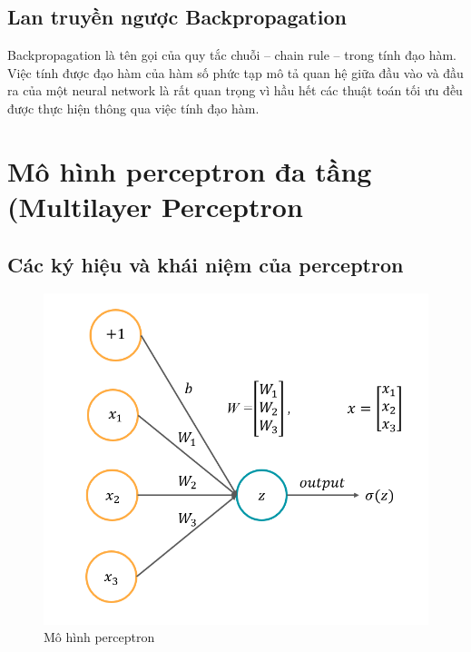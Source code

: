 \documentclass{report}
\begin{document}
            \fontsize{15}{10}\selectfont
            \subsection{Lan truyền ngược Backpropagation}
                \fontsize{13}{10}\selectfont
                    Backpropagation là tên gọi của quy tắc chuỗi – chain rule – trong tính đạo hàm. Việc tính được đạo hàm của hàm số phức tạp mô tả quan hệ giữa đầu vào và đầu ra của một neural network là rất quan trọng vì hầu hết các thuật toán tối ưu đều được thực hiện thông qua việc tính đạo hàm.
                        
\pagebreak
    \fontsize{16}{10}\selectfont
    \section{Mô hình perceptron đa tầng (Multilayer Perceptron}
        \subsection{Các ký hiệu và khái niệm của perceptron}
            \begin{center}
                \begin{figure}[htp]
                    \begin{center}
                        \includegraphics[scale = 0.6]{image/MLP_2.png}
                        \caption{Mô hình perceptron}
                    \end{center}
                \end{figure}
            \end{center}
            
\end{document}
